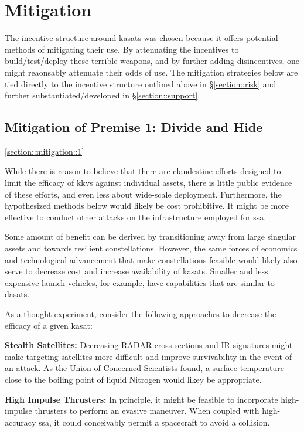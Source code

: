 \section{Mitigation}

The incentive structure around \acp{kasat} was chosen because it
offers potential methods of mitigating their use.  By attenuating the
incentives to build/test/deploy these terrible weapons, and by further
adding disincentives, one might reaonsably attenuate their odds of
use.  The mitigation strategies below are tied directly to the
incentive structure outlined above in \S\ref{section::risk} and
further substantiated/developed in \S\ref{section::support}.

\subsection{Mitigation of Premise 1: Divide and Hide}
\ref{section::mitigation::1}

While there is reason to believe that there are clandestine efforts
designed to limit the efficacy of \acp{kkv} against individual assets,
there is little public evidence of these efforts, and even less about
wide-scale deployment.  Furthermore, the hypothesized methods below
would likely be cost prohibitive.  It might be more effective to
conduct other attacks on the infrastructure employed for \acf{ssa}.

Some amount of benefit can be derived by transitioning away from large
singular assets and towards resilient constellations.  However, the
same forces of economics and technological advancement that make
constellations feasible would likely also serve to decrease cost and
increase availability of \acp{kasat}.  Smaller and less expensive
launch vehicles, for example, have capabilities that are similar to
\acp{dasat}.

As a thought experiment, consider the following approaches to decrease
the efficacy of a given \ac{kasat}:

\textbf{Stealth Satellites:} Decreasing RADAR cross-sections and IR
signatures might make targeting satellites more difficult and improve
survivability in the event of an attack.  As the Union of Concerned
Scientists found, a surface temperature close to the boiling point of
liquid Nitrogen would likey be appropriate.\cite[p48]{abm-me-not}

\textbf{High Impulse Thrusters:} In principle, it might be feasible to
incorporate high-impulse thrusters to perform an evasive maneuver.
When coupled with high-accuracy \ac{ssa}, it could conceivably permit
a spacecraft to avoid a collision.

